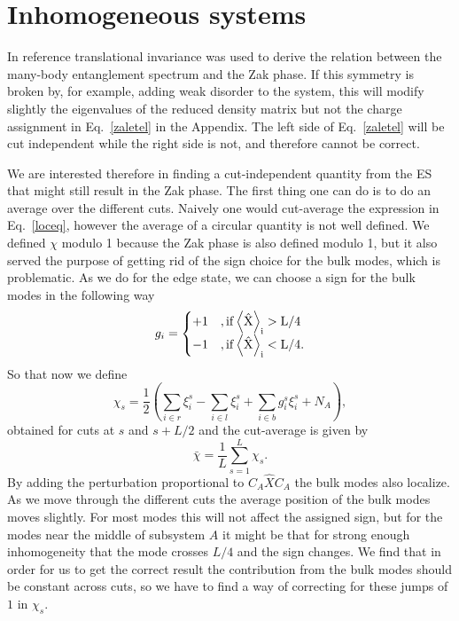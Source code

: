 \documentclass[twocolumn,amsmath,longbibliography,amssymb,superscriptaddress]{revtex4-1}
\begin{document}

\section{Inhomogeneous systems}


In reference \cite{Zaletel2014} translational invariance was used to derive the relation between the many-body entanglement spectrum and the Zak phase. If this symmetry is broken by, for example, adding weak disorder to the system, this will modify slightly the eigenvalues of the reduced density matrix but not the charge assignment in Eq.~\eqref{zaletel} in the Appendix. The left side of Eq.~\eqref{zaletel} will be cut independent while the right side is not, and therefore cannot be correct. 

We are interested therefore in finding a cut-independent quantity from the ES that might still result in the Zak phase. The first thing one can do is to do an average over the different cuts. Naively one would cut-average the expression in Eq.~\eqref{loceq}, however the average of a circular quantity is not well defined. We defined $\chi$ modulo 1 because the Zak phase is also defined modulo 1, but it also served the purpose of getting rid of the sign choice for the bulk modes, which is problematic. As we do for the edge state, we can choose a sign for the bulk modes in the following way
\begin{equation}
g_i=
\begin{cases}
 +1 &,\rm{if} \expval{\hat{X}}_i > L/4  \\
 -1 &,\rm{if} \expval{\hat{X}}_i < L/4.
\end{cases}
\end{equation}
So that now we define
\begin{equation}
\chi_s = \frac{1}{2} \left( \sum_{i\in r}\xi^s_i-\sum_{i\in l}\xi^s_i + \sum_{i\in b}g_i^s \xi^s_i  + N_A \right),
\end{equation}
obtained for cuts at $s$ and $s+L/2$ and the cut-average is given by
\begin{equation}
\bar{\chi} = \frac{1}{L}\sum_{s=1}^L \chi_s.
\label{batcutavg}
\end{equation}
By adding the perturbation proportional to $C_A\hat{X} C_A$ the bulk modes also localize. As we move through the different cuts the average position of the bulk modes moves slightly. For most modes this will not affect the assigned sign, but for the modes near the middle of subsystem $A$ it might be that for strong enough inhomogeneity that the mode crosses $L/4$ and the sign changes. We find that in order for us to get the correct result the contribution from the bulk modes should be constant across cuts, so we have to find a way of correcting for these jumps of $1$ in $\chi_s$. 
\end{document}
